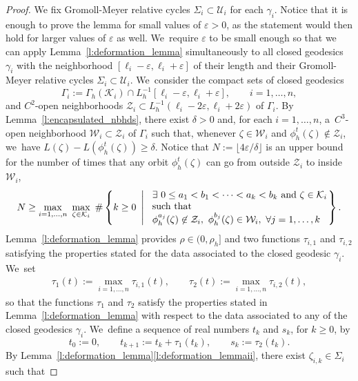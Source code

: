 \documentclass[JEP,XML,SOM,Unicode,NoFloatCountersInSection,published]{cedram}
\let\epsilon\varepsilon
\newcommand{\KK}{\mathcal{K}}
\newcommand{\UU}{\mathcal{U}}
\newcommand{\WW}{\mathcal{W}}
\newcommand{\ZZ}{\mathcal{Z}}
\theoremstyle{plain}
\theoremstyle{definition}
\begin{document}
\begin{proof}
We fix Gromoll-Meyer relative cycles $\Sigma_i\subset\UU_i$ for each $\gamma_i$.
Notice that it is enough to prove the lemma for small values of $\epsilon>0$, as the statement would then hold for larger values of $\epsilon$ as well. We~require $\epsilon$ to be small enough so that we can apply Lemma~\ref{l:deformation_lemma} simultaneously to all closed geodesics $\gamma_i$ with the neighborhood \hbox{$[\ell_i-\epsilon,\ell_i+\epsilon]$} of their length and their Gromoll-Meyer relative cycles $\Sigma_i\subset\UU_i$. We~consider the compact sets of closed geodesics
\[
\Gamma_i:=\Gamma_h(\KK_i)\cap L_h^{-1}[\ell_i-\epsilon,\ell_i+\epsilon],\qquad i=1,\dots,n,
\]
and $C^2$-open neighborhoods $\ZZ_i\subset L_h^{-1}(\ell_i-2\epsilon,\ell_i+2\epsilon)$ of $\Gamma_i$.
By Lemma~\ref{l:encapsulated_nbhds}, there exist $\delta>0$ and, for each $i=1,\dots,n$, a~$C^3$-open neighborhood $\WW_i\subset\ZZ_i$ of $\Gamma_i$ such that, whenever $\zeta\in\WW_i$ and $\phi_h^t(\zeta)\not\in\ZZ_i$, we~have $L(\zeta)-L(\phi_h^t(\zeta))\geq\delta$. Notice that $N:=\lfloor 4\epsilon/\delta \rfloor$ is an upper bound for the number of times that any orbit $\phi_h^t(\zeta)$ can go from outside $\ZZ_i$ to inside $\WW_i$, \ie
\begin{align*}
N
\geq
\max_{i=1,\dots,n}\
\max_{\zeta\in\KK_i}\ \#\left\{k\geq0\ \left|\
\begin{array}{l@{}}
\exists\ 0\leq a_1< b_1< \cdots< a_k< b_k\mbox{ and } \zeta\in\KK_i\\
\mbox{such that}\\
\phi_h^{a_j}(\zeta)\not\in\ZZ_i,\ \phi_h^{b_j}(\zeta)\in\WW_i,\ \forall j=1,\dots,k
\end{array}
\right.\right\}.
\end{align*}
Lemma~\ref{l:deformation_lemma} provides $\rho\in(0,\rho_h]$ and two functions $\tau_{i,1}$ and $\tau_{i,2}$ satisfying the properties stated for the data associated to the closed geodesic $\gamma_i$. We~set
\begin{align*}
\tau_1(t):=\max_{i=1,\dots,n} \tau_{i,1}(t),\qquad
\tau_2(t):=\max_{i=1,\dots,n} \tau_{i,2}(t),
\end{align*}
so that the functions $\tau_1$ and $\tau_2$ satisfy the properties stated in Lemma~\ref{l:deformation_lemma} with respect to the data associated to any of the closed geodesics $\gamma_i$. We~define a sequence of real numbers $t_k$ and $s_k$, for $k\geq0$, by
\[
t_0:=0,
\qquad
t_{k+1}:=t_k+\tau_1(t_k),
\qquad
s_k:=\tau_2(t_k).
\]
By Lemma~\ref{l:deformation_lemma}\eqref{l:deformation_lemmaii}, there exist $\zeta_{i,k}\in\Sigma_i$ such that

\end{proof}
\end{document}
